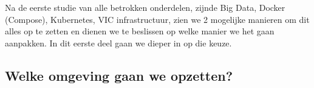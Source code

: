 
\chapter{}%
\label{ch:methodologie}


\lstset{
    language=yaml
    basicstyle=\ttfamily,
    columns=fullflexible,
    frame=single,
    breaklines=true
}



Na de eerste studie van alle betrokken onderdelen, zijnde Big Data, Docker (Compose), Kubernetes, VIC infrastructuur, zien we 2 mogelijke manieren om dit alles op te zetten en dienen we te beslissen op welke manier we het gaan aanpakken. In dit eerste deel gaan we dieper in op die keuze.

\section{Welke omgeving gaan we opzetten?}

